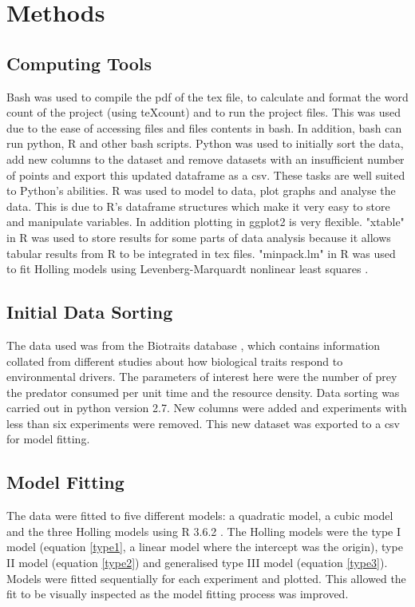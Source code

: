 \documentclass{article}
\begin{document}
\section{Methods}
\subsection{Computing Tools}
Bash was used to compile the pdf of the tex file, to calculate and format the word count of the project (using teXcount) and to run the project files. This was used due to the ease of accessing files and files contents in bash. In addition, bash can run python, R  and other bash scripts.
Python was used to initially sort the data, add new columns to the dataset and remove datasets with an insufficient number of points and export this updated dataframe as a csv. These tasks are well suited to Python's abilities.
R was used to model to data, plot graphs and analyse the data. This is due to R's dataframe structures which make it very easy to store and manipulate variables. In addition plotting in ggplot2 is very flexible. "xtable" in R was used to store results for some parts of data analysis because  it allows tabular results from R to be integrated in tex files. "minpack.lm" in R was used to fit Holling models using Levenberg-Marquardt nonlinear least squares \cite{Elzhov2016}.
\subsection{Initial Data Sorting}
The data used was from the Biotraits database \cite{Dell2013}, which contains information collated from different studies about how biological traits respond to environmental drivers. The parameters of interest here were the number of prey the predator consumed per unit time and the resource density. Data sorting was carried out in python version 2.7. New columns were added and experiments with less than six experiments were removed. This new dataset was exported to a csv for model fitting.
\subsection{Model Fitting}
The data were fitted to five different models: a quadratic model, a cubic model and the three Holling models \cite{Holling1959} using R 3.6.2 \cite{RCoreTeam2017}. The Holling models were the type I model (equation \ref{type1}, a linear model where the intercept was the origin), type II model (equation \ref{type2}) and generalised type III model (equation \ref{type3}). Models were fitted sequentially for each experiment and plotted. This allowed the fit to be visually inspected as the model fitting process was improved.
\end{document}
